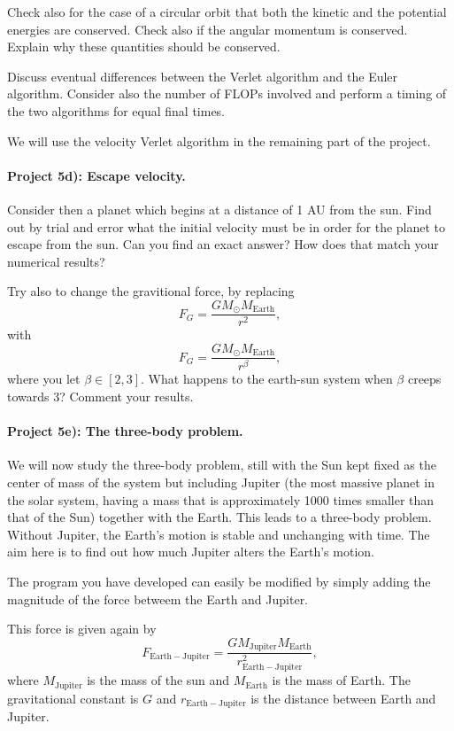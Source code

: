 \documentclass[%
oneside,                 %
final,                   %
10pt]{article}
\begin{document}
Check also for the case of a circular orbit that both the kinetic and the potential energies are conserved.
Check also if the  angular momentum is conserved. Explain why these quantities
should be conserved.

Discuss eventual differences between the Verlet algorithm and the Euler algorithm. Consider also the number of FLOPs involved and perform a timing of the
two algorithms for equal final times.

We will use the velocity Verlet algorithm in the remaining part of the project. 



\paragraph{Project 5d): Escape velocity.}
Consider then a planet which begins at a distance of 1 AU from the sun. Find out by trial and error
what the initial velocity must be in order for the planet to escape from the sun.  Can you find an exact answer?  How does that match your numerical results?

Try also to change the gravitional force, by replacing 
\[
F_G=\frac{GM_{\odot}M_{\mathrm{Earth}}}{r^2},
\]
with
\[
F_G=\frac{GM_{\odot}M_{\mathrm{Earth}}}{r^{\beta}},
\]
where you let $\beta\in [2,3]$. What happens to the earth-sun system when $\beta$ creeps towards $3$? Comment your results.

\paragraph{Project 5e): The three-body problem.}
We will now study the three-body problem, still with the Sun kept fixed as the center of mass of the system  but 
including Jupiter (the most massive planet in the solar system, having a mass that is approximately 1000 times
smaller than that of the Sun) together with the Earth. This leads to a three-body problem. Without Jupiter, the Earth's motion is stable and unchanging with time. The aim here is to find out how much Jupiter alters the Earth's motion.

The program you have developed can easily be modified by simply adding the magnitude of the force betweem the Earth and Jupiter.

This force is given again by 
\[
F_{\mathrm{Earth-Jupiter}}=\frac{GM_{\mathrm{Jupiter}}M_{\mathrm{Earth}}}{r_{\mathrm{Earth-Jupiter}}^2},
\]
where $M_{\mathrm{Jupiter}}$ is the mass of the sun and $M_{\mathrm{Earth}}$ is the mass of Earth. 
The gravitational constant is $G$ and $r_{\mathrm{Earth-Jupiter}}$ is the distance between Earth and Jupiter.
\end{document}

